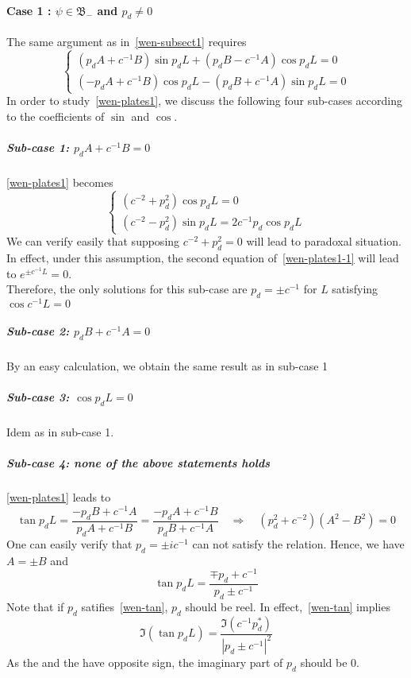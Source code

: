 \paragraph{Case 1 : $\psi \in \mathfrak{B}_-$ and $p_d \neq 0$}
The same argument as in~\cref{wen-subsect1} requires
\begin{equation}\label{wen-plates1}
\begin{cases}
(p_d A + c^{-1} B) \sin p_d L + (p_d B - c^{-1} A)\cos p_d L = 0 \\
(- p_d A + c^{-1}B)\cos p_d L - (p_d B + c^{-1} A)\sin p_d L = 0
\end{cases}
\end{equation}
In order to study~\cref{wen-plates1}, we discuss the following four sub-cases according to the coefficients of $\sin$ and $\cos$.
\subparagraph{Sub-case 1: $ p_d A + c^{-1} B = 0$}
\cref{wen-plates1} becomes
\begin{equation}\label{wen-plates1-1}
\begin{cases}
(c^{-2} + p_d ^2)\cos p_d L = 0 \\
(c^{-2} - p_d^2)\sin p_d L = 2 c^{-1}p_d \cos p_d L
\end{cases}
\end{equation}
We can verify easily that supposing $ c^{-2} + p_d^2 = 0 $ will lead to paradoxal situation. 
In effect, under this assumption, the second equation of~\cref{wen-plates1-1} will lead to $e^{\pm c^{-1}L} = 0$. \\
Therefore, the only solutions for this sub-case are $p_d = \pm c^{-1}$ for $L$ satisfying $\cos c^{-1} L = 0$
%
\subparagraph{Sub-case 2: $ p_d B + c^{-1}A = 0$}
By an easy calculation, we obtain the same result as in sub-case 1
%
\subparagraph{Sub-case 3: $\cos p_d L = 0 $}
Idem as in sub-case 1.
%
\subparagraph{Sub-case 4: none of the above statements holds}
\cref{wen-plates1} leads to
\begin{equation*}
\tan p_d L = \frac{-p_d B + c^{-1} A }{p_d A + c^{-1} B} = 
\frac{-p_d A + c^{-1}B}{p_d B + c^{-1} A}
\quad\Rightarrow\quad
(p_d ^2 + c^{-2})(A^2 - B^2 )= 0
\end{equation*}
One can easily verify that $p_d =  \pm i c^{-1}$ can not satisfy the relation. 
Hence, we have $A = \pm B$ and
\begin{equation}\label{wen-tan}
\tan p_d L = \frac{\mp p_d + c^{-1}}{p_d \pm c^{-1}}
\end{equation}
Note that if $p_d$ satifies~\cref{wen-tan},
$p_d$ should be reel.
In effect,~\cref{wen-tan} implies
\begin{equation*}
\Im (\tan p_d L ) = \frac{\Im(c^{-1} p_d^*)}{|p_d \pm c^{-1}|^2}
\end{equation*}
As the \lhs and the \rhs have opposite sign, 
the imaginary part of $p_d$ should be 0.
%
